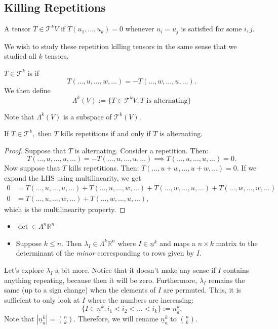 \documentclass{article}
\numberwithin{equation}{section}
\begin{document}
\subsection{Killing Repetitions}
\begin{definition}
    A tensor $T \in \mathcal{T}^k V$  if $T(u_1,\dots,u_k) = 0$ whenever $u_i=u_j$ is satisfied for some $i,j$.
\end{definition}
We wish to study these repetition killing tensors in the same sense that we studied all $k$ tensors.
\begin{definition}
    $T\in \mathcal{T}^k$ is  if
    \begin{equation}
        T(\dots,u,\dots,w,\dots) = -T(\dots,w,\dots,u,\dots).
    \end{equation} 
    We then define
    \begin{equation}
        \Lambda^k(V) := \{T\in \mathcal{T}^k V: T\text{ is alternating}\}
    \end{equation}
\end{definition}
Note that $\Lambda^k(V)$ is a subspace of $\mathcal{T}^k(V).$
\begin{lemma}
    If $T\in \mathcal{T}^k,$ then $T$ kills repetitions if and only if $T$ is alternating.
\end{lemma}
\begin{proof}
    Suppose that $T$ is alternating. Consider a repetition. Then:
    \begin{equation}
        T(\dots,u,\dots,u,\dots) = -T(\dots,u,\dots,u,\dots) \implies T(\dots,u,\dots,u,\dots) = 0.
    \end{equation}
    Now suppose that $T$ kills repetitions. Then: $T(\dots,u+w,\dots,u+w,\dots) = 0.$ If we expand the LHS using multilinearity, we get
    \begin{align*}
        0 &= T(\dots,u,\dots,u,\dots) + T(\dots,u,\dots,w,\dots) + T(\dots,w,\dots,u,\dots) + T(\dots,w,\dots,w,\dots) \\ 
        0 &= T(\dots,u,\dots,w,\dots) + T(\dots,w,\dots,u,\dots),
    \end{align*}
    which is the multilinearity property.
\end{proof}
\begin{itemize}
    \item $\det \in \Lambda^n\mathbb{R}^n$
    \item Suppose $k \le n$. Then $\lambda_I \in \Lambda^k \mathbb{R}^n$ where $I \in \underline{n}^k$ and maps a $n\times k$ matrix to the determinant of the \textit{minor} corresponding to rows given by $I$. 
\end{itemize}
Let's explore $\lambda_I$ a bit more. Notice that it doesn't make any sense if $I$ contains anything repeating, because then it will be zero. Furthermore, $\lambda_I$ remains the same (up to a sign change) when the elements of $I$ are permuted. Thus, it is sufficient to only look at $I$ where the numbers are increasing:
\begin{equation}
    \{I \in \underline{n}^k:i_1<i_2<\dots<i_k\} := \underline{n}^k_a.
\end{equation}
Note that $|\underline{n}^k_a| = \binom{n}{k}$. Therefore, we will rename $\underline{n}^k_a$ to $\binom{\underline{n}}{k}.$
\end{document}
